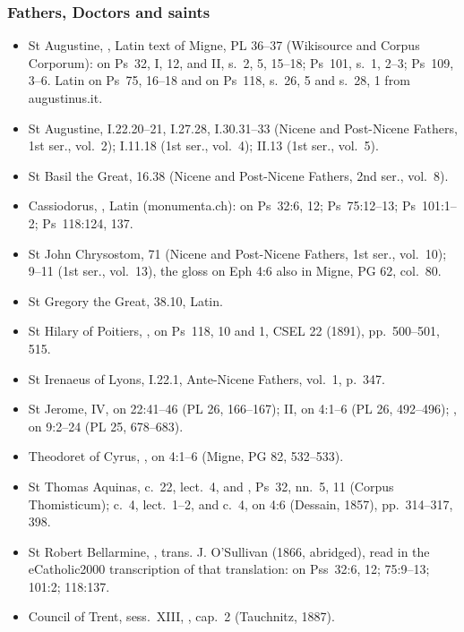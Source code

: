 {\subsubsection*{Fathers, Doctors and saints}
\begin{itemize}\setlength{\itemsep}{0.15em}\setlength{\parskip}{0pt}
\item St Augustine, , Latin text of Migne, PL 36--37 (Wikisource and Corpus Corporum): on Ps~32, I, 12, and II, s.~2, 5, 15--18; Ps~101, s.~1, 2--3; Ps~109, 3--6. Latin on Ps~75, 16--18 and on Ps~118, s.~26, 5 and s.~28, 1 from augustinus.it.
\item St Augustine,  I.22.20--21, I.27.28, I.30.31--33 (Nicene and Post-Nicene Fathers, 1st ser., vol.~2);  I.11.18 (1st ser., vol.~4);  II.13 (1st ser., vol.~5).
\item St Basil the Great,  16.38 (Nicene and Post-Nicene Fathers, 2nd ser., vol.~8).
\item Cassiodorus, , Latin (monumenta.ch): on Ps~32:6, 12; Ps~75:12--13; Ps~101:1--2; Ps~118:124, 137.
\item St John Chrysostom,  71 (Nicene and Post-Nicene Fathers, 1st ser., vol.~10);  9--11 (1st ser., vol.~13), the gloss on Eph 4:6 also in Migne, PG 62, col.~80.
\item St Gregory the Great,  38.10, Latin.
\item St Hilary of Poitiers, , on Ps~118,  10 and  1, CSEL 22 (1891), pp.~500--501, 515.
\item St Irenaeus of Lyons,  I.22.1, Ante-Nicene Fathers, vol.~1, p.~347.
\item St Jerome,  IV, on 22:41--46 (PL 26, 166--167);  II, on 4:1--6 (PL 26, 492--496); , on 9:2--24 (PL 25, 678--683).
\item Theodoret of Cyrus, , on 4:1--6 (Migne, PG 82, 532--533).
\item St Thomas Aquinas,  c.~22, lect.~4, and , Ps~32, nn.~5, 11 (Corpus Thomisticum);  c.~4, lect.~1--2, and  c.~4, on 4:6 (Dessain, 1857), pp.~314--317, 398.
\item St Robert Bellarmine, , trans. J. O'Sullivan (1866, abridged), read in the eCatholic2000 transcription of that translation: on Pss~32:6, 12; 75:9--13; 101:2; 118:137.
\item Council of Trent, sess.~XIII, , cap.~2 (Tauchnitz, 1887).
\end{itemize}

}
